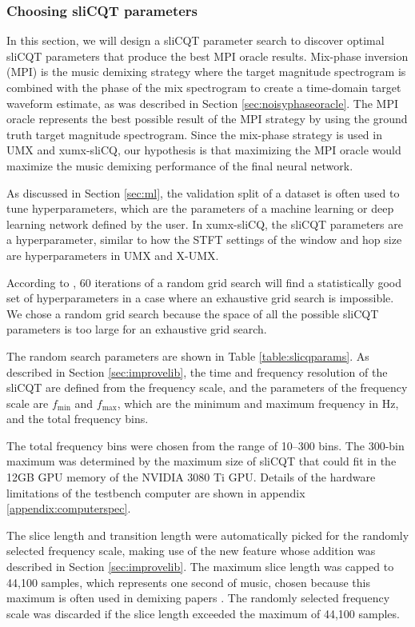 \documentclass[report.tex]{subfiles}
\begin{document}
\newpagefill

\subsubsection{Choosing sliCQT parameters}
\label{sec:slicqparamsrch}

In this section, we will design a sliCQT parameter search to discover optimal sliCQT parameters that produce the best MPI oracle results. Mix-phase inversion (MPI) is the music demixing strategy where the target magnitude spectrogram is combined with the phase of the mix spectrogram to create a time-domain target waveform estimate, as was described in Section \ref{sec:noisyphaseoracle}. The MPI oracle represents the best possible result of the MPI strategy by using the ground truth target magnitude spectrogram. Since the mix-phase strategy is used in UMX and xumx-sliCQ, our hypothesis is that maximizing the MPI oracle would maximize the music demixing performance of the final neural network.

As discussed in Section \ref{sec:ml}, the validation split of a dataset is often used to tune hyperparameters, which are the parameters of a machine learning or deep learning network defined by the user. In xumx-sliCQ, the sliCQT parameters are a hyperparameter, similar to how the STFT settings of the window and hop size are hyperparameters in UMX and X-UMX.

According to \textcite{randomgrid}, 60 iterations of a random grid search will find a statistically good set of hyperparameters in a case where an exhaustive grid search is impossible. We chose a random grid search because the space of all the possible sliCQT parameters is too large for an exhaustive grid search.

The random search parameters are shown in Table \ref{table:slicqparams}. As described in Section \ref{sec:improvelib}, the time and frequency resolution of the sliCQT are defined from the frequency scale, and the parameters of the frequency scale are $f_{\text{min}}$ and $f_{\text{max}}$, which are the minimum and maximum frequency in Hz, and the total frequency bins.

The total frequency bins were chosen from the range of 10--300 bins. The 300-bin maximum was determined by the maximum size of sliCQT that could fit in the 12GB GPU memory of the NVIDIA 3080 Ti GPU. Details of the hardware limitations of the testbench computer are shown in appendix \ref{appendix:computerspec}.

The slice length and transition length were automatically picked for the randomly selected frequency scale, making use of the new feature whose addition was described in Section \ref{sec:improvelib}. The maximum slice length was capped to 44,100 samples, which represents one second of music, chosen because this maximum is often used in demixing papers \parencite{plumbley1, plumbley2, demucs}. The randomly selected frequency scale was discarded if the slice length exceeded the maximum of 44,100 samples.
\end{document}
